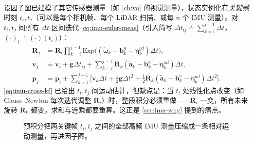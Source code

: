 设因子图已建模了其它传感器测量（如 \cref{ch:vo} 的视觉测量），状态实例化在\emph{关键帧}时刻 $t_i,t_j$（可以是每个相机帧、每个 LiDAR 扫描、或每 $n$ 个 IMU 测量\cite{forster2017preintegration}）。对 $t_i,t_j$ 间所有 $\Delta t$ 区间迭代 \cref{eq:imu-euler-meas}（引入简写 $\Delta t_{ij}\doteq\sum_{k=i}^{j-1}\Delta t$，$(\cdot)_i\doteq(\cdot)(t_i)$）：
\begin{align}
  \mathbf R_j&=\mathbf R_i\prod_{k=i}^{j-1}\mathrm{Exp}\!\big((\tilde{\boldsymbol\omega}_k-\mathbf b_k^g-\boldsymbol\eta_k^{gd})\Delta t\big),\nonumber\\
  \mathbf v_j&=\mathbf v_i+\mathbf g\Delta t_{ij}+\sum_{k=i}^{j-1}\mathbf R_k(\tilde{\mathbf a}_k-\mathbf b_k^a-\boldsymbol\eta_k^{ad})\Delta t,\label{eq:imu-cross-kf}\\
  \mathbf p_j&=\mathbf p_i+\sum_{k=i}^{j-1}\Big[\mathbf v_k\Delta t+\tfrac12\mathbf g\Delta t^2+\tfrac12\mathbf R_k(\tilde{\mathbf a}_k-\mathbf b_k^a-\boldsymbol\eta_k^{ad})\Delta t^2\Big].\nonumber
\end{align}
\cref{eq:imu-cross-kf} 已给出 $t_i,t_j$ 间运动估计，但缺点是：当 $t_i$ 处线性化点改变（如 Gauss--Newton 每次迭代调整 $\mathbf R_i$）时，整段积分必须重做——$\mathbf R_i$ 一变，所有未来旋转 $\mathbf R_k$ 都变，求和与连乘都要重算\cite{forster2017preintegration}。这正是 \cref{sec:imu-why} 提到的痛点。

\begin{figure}[ht]
\centering
{}
\caption{预积分把两关键帧 $t_i,t_j$ 之间的全部高频 IMU 测量压缩成一条相对运动测量，再进因子图。}
\label{fig:imu-preint-timeline}
\end{figure}

